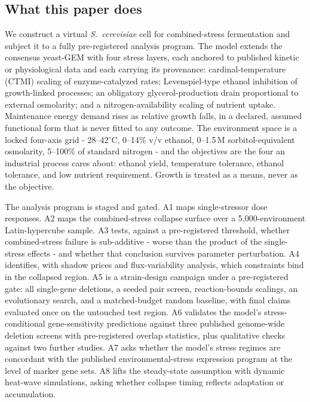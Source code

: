 \documentclass[12pt]{article}
\begin{document}
\subsection{What this paper does}

We construct a virtual \emph{S.\ cerevisiae} cell for combined-stress
fermentation and subject it to a fully pre-registered analysis program.
The model extends the consensus yeast-GEM with four stress layers, each
anchored to published kinetic or physiological data and each carrying its
provenance: cardinal-temperature (CTMI) scaling of enzyme-catalyzed
rates; Levenspiel-type ethanol inhibition of growth-linked processes; an
obligatory glycerol-production drain proportional to external osmolarity;
and a nitrogen-availability scaling of nutrient uptake. Maintenance energy
demand rises as relative growth falls, in a declared, assumed functional
form that is never fitted to any outcome. The environment space is a
locked four-axis grid - 28--42$^\circ$C, 0--14\% v/v ethanol, 0--1.5\,M
sorbitol-equivalent osmolarity, 5--100\% of standard nitrogen - and the
objectives are the four an industrial process cares about: ethanol yield,
temperature tolerance, ethanol tolerance, and low nutrient requirement.
Growth is treated as a means, never as the objective.

The analysis program is staged and gated. A1 maps single-stressor dose
responses. A2 maps the combined-stress collapse surface over a
5{,}000-environment Latin-hypercube sample. A3 tests, against a
pre-registered threshold, whether combined-stress failure is sub-additive
- worse than the product of the single-stress effects - and whether that
conclusion survives parameter perturbation. A4 identifies, with shadow
prices and flux-variability analysis, which constraints bind in the
collapsed region. A5 is a strain-design campaign under a pre-registered
gate: all single-gene deletions, a seeded pair screen, reaction-bounds
scalings, an evolutionary search, and a matched-budget random baseline,
with final claims evaluated once on the untouched test region. A6
validates the model's stress-conditional gene-sensitivity predictions
against three published genome-wide deletion screens with pre-registered
overlap statistics, plus qualitative checks against two further studies.
A7 asks whether the model's stress regimes are concordant with the
published environmental-stress expression program at the level of marker
gene sets. A8 lifts the steady-state assumption with dynamic heat-wave
simulations, asking whether collapse timing reflects adaptation or
accumulation.
\end{document}
